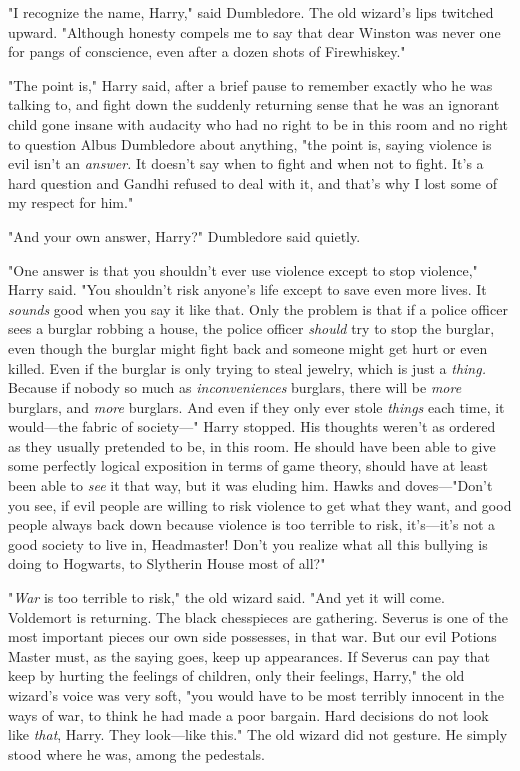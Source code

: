 "I recognize the name, Harry," said Dumbledore. The old wizard's lips twitched 
upward. "Although honesty compels me to say that dear Winston was never one for 
pangs of conscience, even after a dozen shots of Firewhiskey."

"The point is," Harry said, after a brief pause to remember exactly who he was 
talking to, and fight down the suddenly returning sense that he was an ignorant 
child gone insane with audacity who had no right to be in this room and no 
right to question Albus Dumbledore about anything, "the point is, saying 
violence is evil isn't an \emph{answer.} It doesn't say when to fight and when 
not to fight. It's a hard question and Gandhi refused to deal with it, and 
that's why I lost some of my respect for him."

"And your own answer, Harry?" Dumbledore said quietly.

"One answer is that you shouldn't ever use violence except to stop violence," 
Harry said. "You shouldn't risk anyone's life except to save even more lives. 
It \emph{sounds} good when you say it like that. Only the problem is that if a 
police officer sees a burglar robbing a house, the police officer \emph{should} 
try to stop the burglar, even though the burglar might fight back and someone 
might get hurt or even killed. Even if the burglar is only trying to steal 
jewelry, which is just a \emph{thing.} Because if nobody so much as 
\emph{inconveniences} burglars, there will be \emph{more} burglars, and 
\emph{more} burglars. And even if they only ever stole \emph{things} each time, 
it would---the fabric of society---" Harry stopped. His thoughts weren't as 
ordered as they usually pretended to be, in this room. He should have been able 
to give some perfectly logical exposition in terms of game theory, should have 
at least been able to \emph{see} it that way, but it was eluding him. Hawks and 
doves---"Don't you see, if evil people are willing to risk violence to get what 
they want, and good people always back down because violence is too terrible to 
risk, it's---it's not a good society to live in, Headmaster! Don't you realize 
what all this bullying is doing to Hogwarts, to Slytherin House most of all?"

"\emph{War} is too terrible to risk," the old wizard said. "And yet it will 
come. Voldemort is returning. The black chesspieces are gathering. Severus is 
one of the most important pieces our own side possesses, in that war. But our 
evil Potions Master must, as the saying goes, keep up appearances. If Severus 
can pay that keep by hurting the feelings of children, only their feelings, 
Harry," the old wizard's voice was very soft, "you would have to be most 
terribly innocent in the ways of war, to think he had made a poor bargain. Hard 
decisions do not look like \emph{that}, Harry. They look---like this." The old 
wizard did not gesture. He simply stood where he was, among the pedestals.

